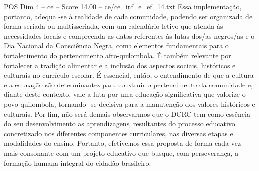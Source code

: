 \begin{textsample}{POS Dim 4 – ce – Score 14.00 – ce/ce\_inf\_e\_ef\_14.txt}
Essa implementação, portanto, adequa -se à realidade de cada comunidade, podendo ser organizada de forma seriada ou multisseriada, com um calendário letivo que atenda às necessidades locais e compreenda as datas referentes às lutas dos/as negros/as e o Dia Nacional da Consciência Negra, como elementos fundamentais para o fortalecimento do pertencimento afro-quilombola.
É também relevante por fortalecer a tradição alimentar e a inclusão dos aspectos sociais, históricos e culturais no currículo escolar.
É essencial, então, o entendimento de que a cultura e a educação são determinantes para construir o pertencimento da comunidade e, diante deste contexto, vale a luta por uma educação significativa que valorize o povo quilombola, tornando -se decisiva para a manutenção dos valores históricos e culturais.
Por fim, não será demais observarmos que o DCRC tem como essência do seu desenvolvimento as aprendizagens, resultantes do processo educativo concretizado nos diferentes componentes curriculares, nas diversas etapas e modalidades do ensino.
Portanto, efetivemos essa proposta de forma cada vez mais consonante com um projeto educativo que busque, com perseverança, a formação humana integral do cidadão brasileiro.

\end{textsample}
